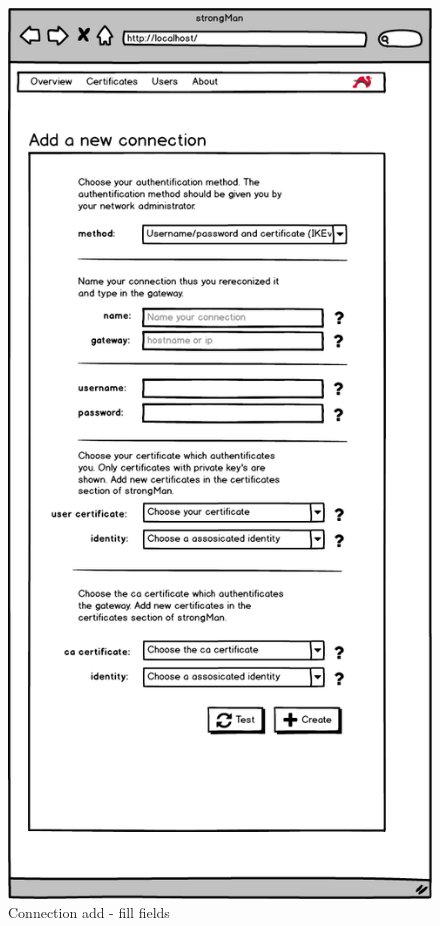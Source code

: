 \begin{figure}[H]
	\centering
	\includegraphics[width=350pt]{images/mockups/con_config2.png}
	\caption{Connection add - fill fields}
\end{figure}

